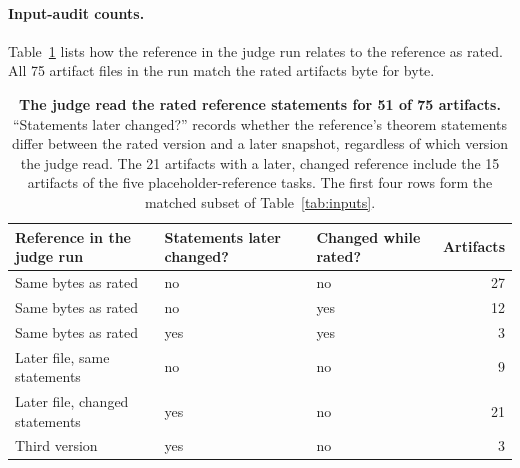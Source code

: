 \paragraph{Input-audit counts.}
Table~\ref{tab:audit} lists how the reference in the judge run relates to the reference as rated.
All 75 artifact files in the run match the rated artifacts byte for byte.

\begin{table}[h]
\centering
\small
\begin{tabular}{lllr}
\toprule
Reference in the judge run & Statements later changed? & Changed while rated? & Artifacts \\
\midrule
Same bytes as rated & no & no & 27 \\
Same bytes as rated & no & yes & 12 \\
Same bytes as rated & yes & yes & 3 \\
Later file, same statements & no & no & 9 \\
Later file, changed statements & yes & no & 21 \\
Third version & yes & no & 3 \\
\bottomrule
\end{tabular}
\caption{\textbf{The judge read the rated reference statements for 51 of 75 artifacts.} ``Statements later changed?'' records whether the reference's theorem statements differ between the rated version and a later snapshot, regardless of which version the judge read.
The 21 artifacts with a later, changed reference include the 15 artifacts of the five placeholder-reference tasks.
The first four rows form the matched subset of Table~\ref{tab:inputs}.}
\label{tab:audit}
\end{table}
